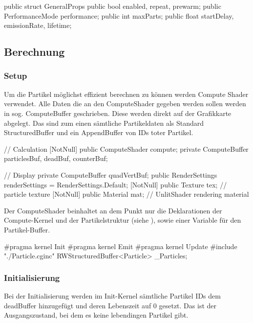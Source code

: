 \begin{csh}[caption=Partikel Struktur]
public struct GeneralProps
{
    public bool enabled, repeat, prewarm;
    public PerformanceMode performance;
    public int maxParts;
    public float startDelay, emissionRate, lifetime;
}
\end{csh}



\subsection{Berechnung}


\subsubsection{Setup}

Um die Partikel möglichst effizient berechnen zu können werden Compute Shader verwendet. Alle Daten die an den ComputeShader gegeben werden sollen werden in sog. ComputeBuffer geschrieben. Diese werden direkt auf der Grafikkarte abgelegt. Das sind zum einen sämtliche Partikeldaten als Standard StructuredBuffer und ein AppendBuffer von IDs toter Partikel.

\begin{csh}[caption=Controller Setup,label=lst:partSetup]
// Calculation
[NotNull] public ComputeShader compute;
private ComputeBuffer particlesBuf, deadBuf, counterBuf;

// Display
private ComputeBuffer quadVertBuf;
public RenderSettings renderSettings = RenderSettings.Default;
[NotNull] public Texture tex;  // particle texture
[NotNull] public Material mat; // UnlitShader rendering material
\end{csh}

Der ComputeShader beinhaltet an dem Punkt nur die Deklarationen der Compute-Kernel und der Partikelstruktur (siehe ), sowie einer Variable für den Partikel-Buffer.

\begin{hlsl}[caption=Compute Setup]
#pragma kernel Init
#pragma kernel Emit
#pragma kernel Update
#include "./Particle.cginc"
RWStructuredBuffer<Particle> _Particles;
\end{hlsl}

\subsubsection{Initialisierung}

Bei der Initialisierung werden im Init-Kernel sämtliche Partikel IDs dem deadBuffer hinzugefügt und deren Lebenszeit auf 0 gesetzt. Das ist der Ausgangszustand, bei dem es keine lebendingen Partikel gibt.

